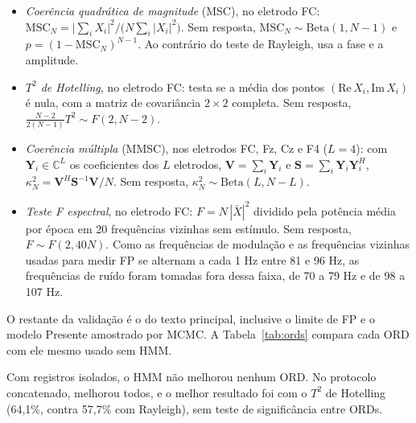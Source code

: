 \documentclass[conference]{IEEEtran}
\begin{document}
\begin{itemize}
\item \textit{Coerência quadrática de magnitude} (MSC), no eletrodo FC: $\mathrm{MSC}_N=\big|\sum_i X_i\big|^2\big/\big(N\sum_i|X_i|^2\big)$. Sem resposta, $\mathrm{MSC}_N\sim\mathrm{Beta}(1,N-1)$ e $p=(1-\mathrm{MSC}_N)^{N-1}$. Ao contrário do teste de Rayleigh, usa a fase e a amplitude.
\item \textit{$T^2$ de Hotelling}, no eletrodo FC: testa se a média dos pontos $(\mathrm{Re}\,X_i,\mathrm{Im}\,X_i)$ é nula, com a matriz de covariância $2\times2$ completa. Sem resposta, $\frac{N-2}{2(N-1)}T^2\sim F(2,N-2)$.
\item \textit{Coerência múltipla} (MMSC), nos eletrodos FC, Fz, Cz e F4 ($L=4$): com $\mathbf{Y}_i\in\mathbb{C}^L$ os coeficientes dos $L$ eletrodos, $\mathbf{V}=\sum_i\mathbf{Y}_i$ e $\mathbf{S}=\sum_i\mathbf{Y}_i\mathbf{Y}_i^{H}$, $\kappa^2_N=\mathbf{V}^{H}\mathbf{S}^{-1}\mathbf{V}/N$. Sem resposta, $\kappa^2_N\sim\mathrm{Beta}(L,N-L)$.
\item \textit{Teste F espectral}, no eletrodo FC: $F=N\,|\bar{X}|^2$ dividido pela potência média por época em 20 frequências vizinhas sem estímulo. Sem resposta, $F\sim F(2,40N)$. Como as frequências de modulação e as frequências vizinhas usadas para medir FP se alternam a cada 1 Hz entre 81 e 96 Hz, as frequências de ruído foram tomadas fora dessa faixa, de 70 a 79 Hz e de 98 a 107 Hz.
\end{itemize}

O restante da validação é o do texto principal, inclusive o limite de FP e o modelo Presente amostrado por MCMC. A Tabela~\ref{tab:ords} compara cada ORD com ele mesmo usado sem HMM.


Com registros isolados, o HMM não melhorou nenhum ORD. No protocolo concatenado, melhorou todos, e o melhor resultado foi com o $T^2$ de Hotelling (64,1\%, contra 57,7\% com Rayleigh), sem teste de significância entre ORDs.
\end{document}
